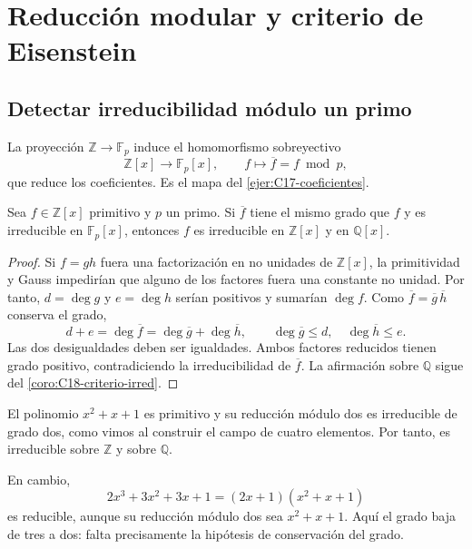 \section{Reducción modular y criterio de Eisenstein}
\subsection{Detectar irreducibilidad módulo un primo}
La proyección $\mathbb Z\to\mathbb F_p$ induce el homomorfismo sobreyectivo
\[
\mathbb Z[x]\longrightarrow\mathbb F_p[x],\qquad
f\longmapsto\overline f=f\bmod p,
\]
que reduce los coeficientes. Es el mapa del \cref{ejer:C17-coeficientes}.

\begin{prop}\label{prop:C19-modular}
Sea $f\in\mathbb Z[x]$ primitivo y $p$ un primo. Si $\overline f$ tiene el mismo grado que $f$ y es irreducible en $\mathbb F_p[x]$, entonces $f$ es irreducible en $\mathbb Z[x]$ y en $\mathbb Q[x]$.
\end{prop}
\begin{proof}
Si $f=gh$ fuera una factorización en no unidades de $\mathbb Z[x]$, la primitividad y Gauss impedirían que alguno de los factores fuera una constante no unidad. Por tanto, $d=\deg g$ y $e=\deg h$ serían positivos y sumarían $\deg f$. Como $\overline f=\overline g\,\overline h$ conserva el grado,
\[
d+e=\deg\overline f=\deg\overline g+\deg\overline h,
\qquad \deg\overline g\leq d,\quad\deg\overline h\leq e.
\]
Las dos desigualdades deben ser igualdades. Ambos factores reducidos tienen grado positivo, contradiciendo la irreducibilidad de $\overline f$. La afirmación sobre $\mathbb Q$ sigue del \cref{coro:C18-criterio-irred}.
\end{proof}
\begin{ejem}
El polinomio $x^2+x+1$ es primitivo y su reducción módulo dos es irreducible de grado dos, como vimos al construir el campo de cuatro elementos. Por tanto, es irreducible sobre $\mathbb Z$ y sobre $\mathbb Q$.

En cambio,
\[
2x^3+3x^2+3x+1=(2x+1)(x^2+x+1)
\]
es reducible, aunque su reducción módulo dos sea $x^2+x+1$. Aquí el grado baja de tres a dos: falta precisamente la hipótesis de conservación del grado.
\end{ejem}

